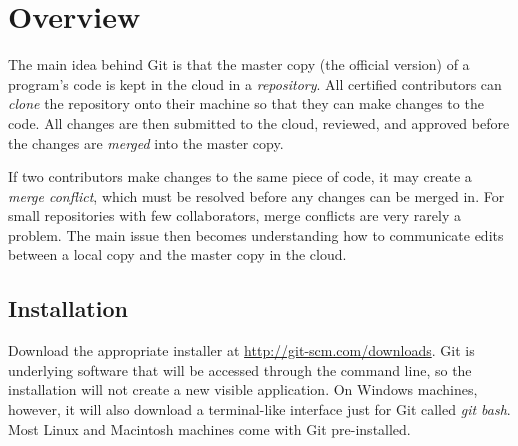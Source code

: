 \label{appendix:git2}


\section*{Overview} %

The main idea behind Git is that the master copy (the official version) of a program's code is kept in the cloud in a \emph{repository}.
All certified contributors can \emph{clone} the repository onto their machine so that they can make changes to the code.
All changes are then submitted to the cloud, reviewed, and approved before the changes are \emph{merged} into the master copy.

If two contributors make changes to the same piece of code, it may create a \emph{merge conflict}, which must be resolved before any changes can be merged in.
For small repositories with few collaborators, merge conflicts are very rarely a problem.
The main issue then becomes understanding how to communicate edits between a local copy and the master copy in the cloud.

\subsection*{Installation} %

Download the appropriate installer at \url{http://git-scm.com/downloads}.
Git is underlying software that will be accessed through the command line, so the installation will not create a new visible application.
On Windows machines, however, it will also download a terminal-like interface just for Git called \emph{git bash}.
Most Linux and Macintosh machines come with Git pre-installed.

